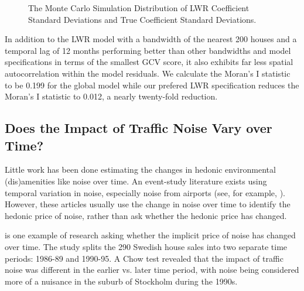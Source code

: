 \documentclass{article}\usepackage{graphicx, color}
\begin{document}
\begin{figure}
 \caption{The Monte Carlo Simulation Distribution of LWR Coefficient Standard Deviations and True Coefficient Standard Deviations.}\label{fig:MCsds}
\end{figure}
 
In addition to the LWR model with a bandwidth of the nearest 200 houses and a temporal lag of 12 months performing better than other bandwidths and model specifications in terms of the smallest GCV score, it also exhibits far less spatial autocorrelation within the model residuals. We calculate the Moran’s I statistic to be 0.199 for the global model while our prefered LWR specification reduces the Moran's I statistic to 0.012, a nearly twenty-fold reduction. 

\subsection{Does the Impact of Traffic Noise Vary over Time?}
Little work has been done estimating the changes in hedonic environmental (dis)amenities like noise over time. An event-study literature exists using temporal variation in noise, especially noise from airports (see, for example, \citet{Cohen2009}). However, these articles usually use the change in noise over time to identify the hedonic price of noise, rather than ask whether the hedonic price has changed.

\citet{Wilhelmsson2000} is one example of research asking whether the implicit price of noise has changed over time. The study splits the 290 Swedish house sales into two separate time periods: 1986-89 and 1990-95. A Chow test revealed that the impact of traffic noise was different in the earlier vs. later time period, with noise being considered more of a nuisance in the suburb of Stockholm during the 1990s. 
\end{document}
